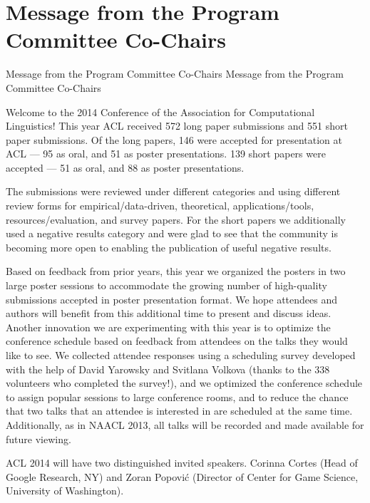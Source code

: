 \section{Message from the Program Committee Co-Chairs}
\setheaders%
    {Message from the Program Committee Co-Chairs}%
    {Message from the Program Committee Co-Chairs}
\thispagestyle{emptyheader}
\begin{large}

\setlength{\parskip}{.7ex}

Welcome to the 2014 Conference of the Association for Computational
Linguistics! This year ACL received 572 long paper submissions and 551
short paper submissions. Of the long papers, 146 were accepted for
presentation at ACL --- 95 as oral, and 51 as poster
presentations. 139 short papers were accepted --- 51 as oral, and 88
as poster presentations.

The submissions were reviewed under different categories and using
different review forms for empirical/data-driven, theoretical,
applications/tools, resources/evaluation, and survey papers. For the
short papers we additionally used a negative results category and were
glad to see that the community is becoming more open to enabling the
publication of useful negative results.

Based on feedback from prior years, this year we organized the posters
in two large poster sessions to accommodate the growing number of
high-quality submissions accepted in poster presentation format. We
hope attendees and authors will benefit from this additional time to
present and discuss ideas.  Another innovation we are experimenting
with this year is to optimize the conference schedule based on
feedback from attendees on the talks they would like to see. We
collected attendee responses using a scheduling survey developed with
the help of David Yarowsky and Svitlana Volkova (thanks to the 338
volunteers who completed the survey!), and we optimized the conference
schedule to assign popular sessions to large conference rooms, and to
reduce the chance that two talks that an attendee is interested in are
scheduled at the same time.  Additionally, as in NAACL 2013, all talks
will be recorded and made available for future viewing.

ACL 2014 will have two distinguished invited speakers. Corinna Cortes
(Head of Google Research, NY) and Zoran Popovi\'{c} (Director of
Center for Game Science, University of Washington).


\end{large}
